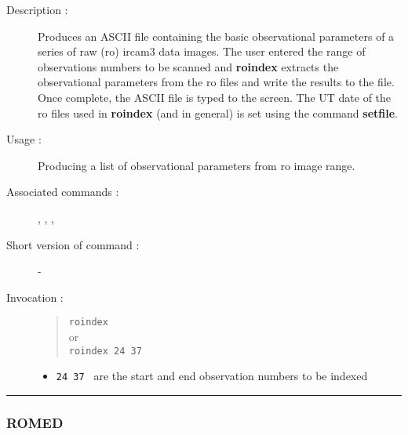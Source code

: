 \begin{description}

\item[Description :] Produces an ASCII file containing the basic
observational parameters of a series of raw ({\sc ro}) {\sc ircam3}
data images.  The user entered the range of observations numbers to be
scanned and {\bf roindex} extracts the observational parameters from
the {\sc ro} files and write the results to the file.  Once complete,
the ASCII file is typed to the screen.  The UT date of the {\sc ro}
files used in {\bf roindex} (and in general) is set using the command
{\bf setfile}.

\item[Usage :] Producing a list of observational parameters from {\sc ro} image 
range.

\item[Associated commands :] {\tt {}}, 
{\tt {}}, {\tt {}}, 
{\tt {}}

\item[Short version of command :] -
\item[Invocation :]

\begin{quote}{\tt  roindex }\\
or \\
{\tt roindex 24 37 }
\end{quote}

\begin{itemize}

\item {\tt 24 37 } are the start and end observation numbers to be
 indexed
\end{itemize}

\end{description}

\hrule 
\subsubsection*{\label{ROMED}ROMED}

